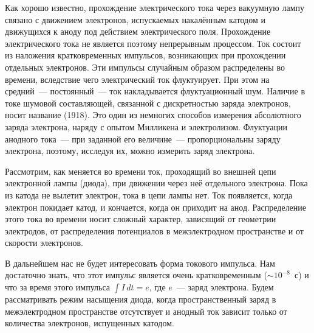 


Как хорошо известно, прохождение электрического тока через вакуумную лампу связано с движением электронов, испускаемых
накалённым катодом и движущихся к аноду под действием электрического поля. Прохождение электрического тока не является
поэтому непрерывным процессом. Ток состоит из наложения кратковременных импульсов, возникающих при прохождении отдельных
электронов. Эти импульсы случайным образом распределены во времени, вследствие чего электрический ток флуктуирует. При
этом на средний~--- постоянный~--- ток накладывается флуктуационный шум. Наличие в токе шумовой составляющей, связанной
с дискретностью заряда электронов, носит название  (1918). Это один из немногих способов измерения
абсолютного заряда электрона, наряду с опытом Милликена и электролизом. Флуктуации анодного тока~--- при заданной его
величине~--- пропорциональны заряду электрона, поэтому, исследуя их, можно измерить заряд электрона.


Рассмотрим, как меняется во времени ток, проходящий во внешней цепи электронной лампы (диода), при движении через неё
отдельного электрона. Пока из катода не вылетит электрон, тока в цепи лампы нет. Ток появляется, когда электрон покидает
катод, и кончается, когда он приходит на анод. Распределение этого тока во времени носит сложный характер, зависящий от
геометрии электродов, от распределения потенциалов в межэлектродном пространстве и от скорости электронов.

В дальнейшем нас не будет интересовать форма токового импульса. Нам достаточно знать, что этот импульс является очень
кратковременным (${\sim}10^{-8}$~с) и что за время этого импульса $\int I\,dt=e$, где $e$~--- заряд электрона. Будем
рассматривать режим насыщения диода, когда пространственный заряд в межэлектродном пространстве отсутствует и анодный
ток зависит только от количества электронов, испущенных катодом.

